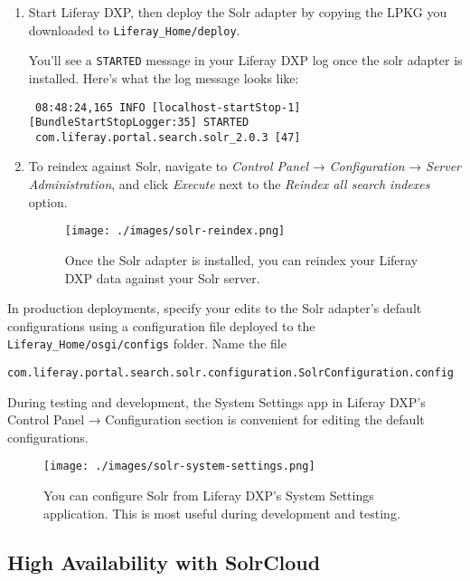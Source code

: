 \begin{enumerate}
\def\labelenumi{\arabic{enumi}.}
\item
  Start Liferay DXP, then deploy the Solr adapter by copying the LPKG
  you downloaded to \texttt{Liferay\_Home/deploy}.

  You'll see a \texttt{STARTED} message in your Liferay DXP log once the
  solr adapter is installed. Here's what the log message looks like:

\begin{verbatim}
 08:48:24,165 INFO [localhost-startStop-1][BundleStartStopLogger:35] STARTED
 com.liferay.portal.search.solr_2.0.3 [47]
\end{verbatim}
\item
  To reindex against Solr, navigate to \emph{Control Panel} →
  \emph{Configuration} → \emph{Server Administration}, and click
  \emph{Execute} next to the \emph{Reindex all search indexes} option.

  \begin{figure}
  \centering
  \texttt{[image: ./images/solr-reindex.png]}
  \caption{Once the Solr adapter is installed, you can reindex your
  Liferay DXP data against your Solr server.}
  \end{figure}
\end{enumerate}

In production deployments, specify your edits to the Solr adapter's
default configurations using a configuration file deployed to the
\texttt{Liferay\_Home/osgi/configs} folder. Name the file

\begin{verbatim}
com.liferay.portal.search.solr.configuration.SolrConfiguration.config
\end{verbatim}

During testing and development, the System Settings app in Liferay DXP's
Control Panel → Configuration section is convenient for editing the
default configurations.

\begin{figure}
\centering
\texttt{[image: ./images/solr-system-settings.png]}
\caption{You can configure Solr from Liferay DXP's System Settings
application. This is most useful during development and testing.}
\end{figure}

\subsection{High Availability with
SolrCloud}\label{high-availability-with-solrcloud}

